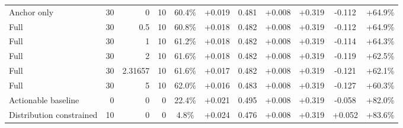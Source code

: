 \begin{table}[htbp]
\begin{tabular}{lrrrccccccc}
Anchor only & 30 & 0 & 10 & 60.4\% & +0.019 & 0.481 & +0.008 & +0.319 & -0.112 & +64.9\% \\
Full & 30 & 0.5 & 10 & 60.8\% & +0.018 & 0.482 & +0.008 & +0.319 & -0.112 & +64.9\% \\
Full & 30 & 1 & 10 & 61.2\% & +0.018 & 0.482 & +0.008 & +0.319 & -0.114 & +64.3\% \\
Full & 30 & 2 & 10 & 61.6\% & +0.018 & 0.482 & +0.008 & +0.319 & -0.119 & +62.5\% \\
Full & 30 & 2.31657 & 10 & 61.6\% & +0.017 & 0.482 & +0.008 & +0.319 & -0.121 & +62.1\% \\
Full & 30 & 5 & 10 & 62.0\% & +0.016 & 0.483 & +0.008 & +0.319 & -0.127 & +60.3\% \\
Actionable baseline & 0 & 0 & 0 & 22.4\% & +0.021 & 0.495 & +0.008 & +0.319 & -0.058 & +82.0\% \\
Distribution constrained & 10 & 0 & 0 & 4.8\% & +0.024 & 0.476 & +0.008 & +0.319 & +0.052 & +83.6\% \\
\bottomrule
\end{tabular}
\end{table}